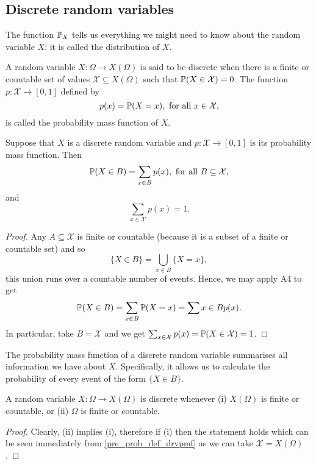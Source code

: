 \documentclass[10pt, a4paper]{article}
\begin{document}
\subsection{Discrete random variables}
The function $\P_X$ tells us everything we might need to know about the random variable $X$: it is called the distribution of $X$.

\begin{definition}\label{pre_prob_def_drvpmf}
    A random variable $X : \Omega \rightarrow X(\Omega)$ is said to be discrete when there is a finite or countable set of values $\mathcal{X} \subseteq X(\Omega)$ such that $\P(X \in \mathcal{X}) = 0$.
    The function $p: \mathcal{X} \rightarrow [0, 1]$ defined by
    \[
    p(x) = \P(X = x),\text{ for all } x \in \mathcal{X},
    \]
    is called the probability mass function of $X$.
\end{definition}

\begin{theorem}
    Suppose that $X$ is a discrete random variable and $p : \mathcal{X} \rightarrow [0, 1]$ is its probability mass function. Then
    \[
    \P(X \in B) = \sum_{x \in B}p(x),\text{ for all } B \subseteq \mathcal{X},
    \]
    and
    \[
    \sum_{x \in \mathcal{X}}p(x) = 1.
    \]
    \begin{proof}
        Any $A \subseteq \mathcal{X}$ is finite or countable (because it is a subset of a finite or countable set) and so
        \[
        \{X \in B\} = \bigcup_{x \in B}\{X = x\},
        \]
        this union runs over a countable number of events.
        Hence, we may apply A4 to get
        \[
        \P(X \in B) = \sum_{x \in B}\P(X = x) = \sum{x \in B}p(x).
        \]
        In particular, take $B = \mathcal{X}$ and we get $\sum_{x \in \mathcal{X}}p(x) = \P(X \in \mathcal{X}) = 1$.
    \end{proof}
\end{theorem}
The probability mass function of a discrete random variable summarises all information we have about $X$.
Specifically, it allows us to calculate the probability of every event of the form $\{X \in B\}$.

\begin{theorem}
    A random variable $X : \Omega \rightarrow X(\Omega)$ is discrete whenever (i) $X(\Omega)$ is finite or countable,
    or (ii) $\Omega$ is finite or countable.
    \begin{proof}
        Clearly, (ii) implies (i),
        therefore if (i) then the statement holds which can be seen immediately from \autoref{pre_prob_def_drvpmf} as we can take $\mathcal{X} = X(\Omega)$.
    \end{proof}
\end{theorem}
\end{document}
